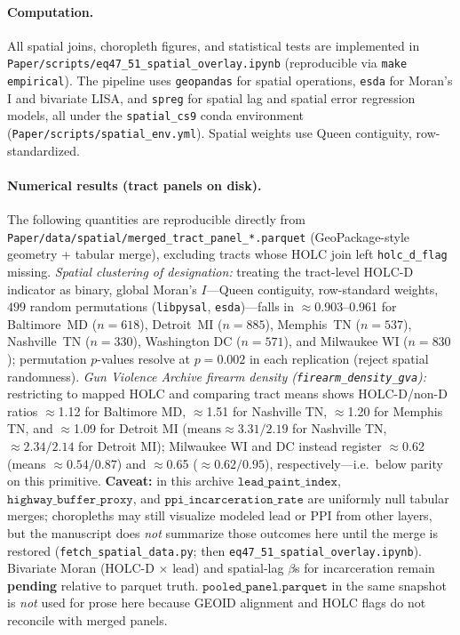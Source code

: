 \paragraph{Computation.}
All spatial joins, choropleth figures, and statistical tests are implemented in \texttt{Paper/scripts/eq47\_51\_spatial\_overlay.ipynb} (reproducible via \texttt{make empirical}). The pipeline uses \texttt{geopandas} for spatial operations, \texttt{esda} for Moran's I and bivariate LISA, and \texttt{spreg} for spatial lag and spatial error regression models, all under the \texttt{spatial\_cs9} conda environment (\texttt{Paper/scripts/spatial\_env.yml}). Spatial weights use Queen contiguity, row-standardized.

\paragraph{Numerical results (tract panels on disk).}
The following quantities are reproducible directly from \texttt{Paper/data/spatial/merged\_tract\_panel\_*.parquet} (GeoPackage-style geometry + tabular merge), excluding tracts whose HOLC join left \texttt{holc\_d\_flag} missing. \emph{Spatial clustering of designation:} treating the tract-level HOLC-D indicator as binary, global Moran's $I$---Queen contiguity, row-standard weights, \(499\) random permutations (\texttt{libpysal}, \texttt{esda})---falls in \(\approx\)0.903--0.961 for Baltimore~MD (\(n{=}618\)), Detroit~MI (\(n{=}885\)), Memphis~TN (\(n{=}537\)), Nashville~TN (\(n{=}330\)), Washington DC (\(n{=}571\)), and Milwaukee WI (\(n{=}830\)); permutation $p$-values resolve at \(p{=}0{.}002\) in each replication (reject spatial randomness). \emph{Gun Violence Archive firearm density (\texttt{firearm\_density\_gva}):} restricting to mapped HOLC and comparing tract means shows HOLC-D/non-D ratios \(\approx\)1.12 for Baltimore MD, \(\approx\)1.51 for Nashville TN, \(\approx\)1.20 for Memphis TN, and \(\approx\)1.09 for Detroit MI (\(\mathrm{means}\approx 3.31{/}2.19\) for Nashville TN, \(\approx 2.34{/}2.14\) for Detroit MI); Milwaukee WI and DC instead register \(\approx\)0.62 (means \(\approx 0{.}54{/}0{.}87\)) and \(\approx\)0.65 (\(\approx 0{.}62{/}0{.}95\)), respectively---i.e.\ below parity on this primitive. \textbf{Caveat:} in this archive \(\texttt{lead\_paint\_index}\), \(\texttt{highway\_buffer\_proxy}\), and \(\texttt{ppi\_incarceration\_rate}\) are uniformly null tabular merges; choropleths may still visualize modeled lead or PPI from other layers, but the manuscript does \emph{not} summarize those outcomes here until the merge is restored (\texttt{fetch\_spatial\_data.py}; then \texttt{eq47\_51\_spatial\_overlay.ipynb}). Bivariate Moran (HOLC-D \(\times\) lead) and spatial-lag $\beta$s for incarceration remain \textbf{pending} relative to parquet truth. \(\texttt{pooled\_panel.parquet}\) in the same snapshot is \emph{not} used for prose here because GEOID alignment and HOLC flags do not reconcile with merged panels.

